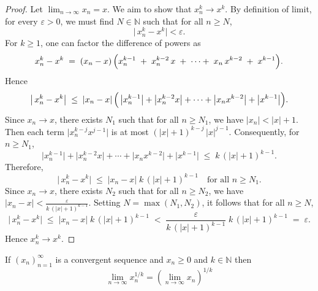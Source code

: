 \documentclass[../main.tex]{subfiles}
\begin{document}
    
    \begin{proof}
        Let \(\lim_{n\to\infty} x_n = x\). We aim to show that \(x_n^k \to x^k\). By definition of limit, for every \(\varepsilon > 0\), we must find \(N \in \mathbb{N}\) such that for all \(n \ge N\),
        \[
        \bigl|\,x_n^k - x^k\bigr| < \varepsilon.
        \]
        For \(k \ge 1\), one can factor the difference of powers as  
        \[
          x_n^k - x^k 
          \;=\; 
          (x_n - x)\,\Bigl(x_n^{k-1} \;+\; x_n^{k-2}\,x \;+\;\cdots+\;x_n\,x^{k-2} \;+\; x^{k-1}\Bigr).
        \]
        Hence
        \[
          \bigl|\,x_n^k - x^k\bigr|
          \;\le\;
          |x_n - x|\,
          \Bigl(\,\bigl|x_n^{k-1}\bigr| + \bigl|x_n^{k-2}x\bigr| + \cdots + \bigl|x_n x^{k-2}\bigr| + \bigl|x^{k-1}\bigr|\Bigr).
        \]
        Since \(x_n \to x\), there exists \(N_1\) such that for all \(n \ge N_1\), we have \(\bigl|x_n\bigr| < |x| + 1\). Then each term \(\bigl|x_n^{k-j}x^{j-1}\bigr|\) is at most \((|x|+1)^{k-j}\,|x|^{j-1}\). Consequently, for \(n \ge N_1\),
   \[
     \bigl|x_n^{k-1}\bigr| + \bigl|x_n^{k-2}x\bigr| + \cdots + \bigl|x_n x^{k-2}\bigr| + \bigl|x^{k-1}\bigr|
     \;\le\;
     k\,(|x|+1)^{k-1}.
   \]
   Therefore,
   \[
     \bigl|\,x_n^k - x^k\bigr|
     \;\le\;
     |x_n - x|\;k\,(|x|+1)^{k-1}
     \quad
     \text{for all } n \ge N_1.
   \]
   Since \(x_n \to x\), there exists \(N_2\) such that for all \(n \ge N_2\), we have \(\bigl|x_n - x\bigr| < \frac{\varepsilon}{k\,(|x|+1)^{k-1}}\). Setting \(N = \max(N_1, N_2)\), it follows that for all \(n \ge N\),
   \[
     \bigl|\,x_n^k - x^k\bigr|
     \;\le\;
     |x_n - x|\;k\,(|x|+1)^{k-1}
     \;<\;
     \frac{\varepsilon}{k\,(|x|+1)^{k-1}} \;k\,(|x|+1)^{k-1}
     \;=\;
     \varepsilon.
   \]
   Hence \(x_n^k \to x^k\).
    \end{proof}
    
    
    
    
    \begin{exercise}
    If $ (x_n)^\infty_{n=1}$ is a convergent sequence and $ x_n \geq 0 $ and $ k \in \mathbb{N}$ then
    \[
    \lim_{n \to \infty}{x_n^{1/k}} = \left( \lim_{n \to \infty}{x_n}\right)^{1/k}
    \]
    \end{exercise}
    
    
    
\end{document}
